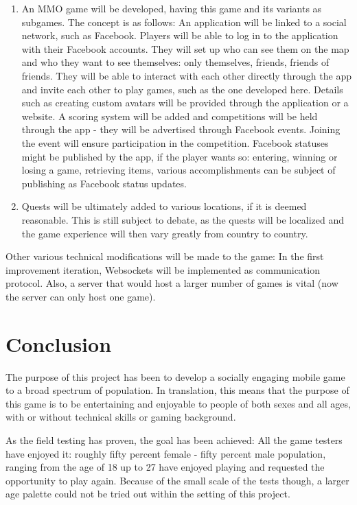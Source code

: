 \begin{enumerate}
  \item An MMO game will be developed, having this game and its variants as
  subgames. The concept is as follows: An application will be linked to a social
  network, such as Facebook. Players will be able to log in to the application
  with their Facebook accounts. They will set up who can see them on the map and
  who they want to see themselves: only themselves, friends, friends of friends.
  They will be able to interact with each other directly through the app and
  invite each other to play games, such as the one developed here. Details such
  as creating custom avatars will be provided through the application or a
  website. A scoring system will be added and competitions will be held through
  the app - they will be advertised through Facebook events. Joining the event
  will ensure participation in the competition. Facebook statuses might be
  published by the app, if the player wants so: entering, winning or losing a
  game, retrieving items, various accomplishments can be subject of publishing
  as Facebook status updates.
  
  \item Quests will be ultimately added to various locations, if it is deemed
  reasonable. This is still subject to debate, as the quests will be localized
  and the game experience will then vary greatly from country to country.  
  
\end{enumerate}

Other various technical modifications will be made to the game: In the first
improvement iteration, Websockets will be implemented as communication protocol.
Also, a server that would host a larger number of games is vital (now the
server can only host one game).


\section{Conclusion}

The purpose of this project has been to develop a socially engaging mobile game
to a broad spectrum of population. In translation, this means that the purpose
of this game is to be entertaining and enjoyable to people of both sexes and all
ages, with or without technical skills or gaming background. \newline

As the field testing has proven, the goal has been achieved: All the game
testers have enjoyed it: roughly fifty percent female - fifty percent male
population, ranging from the age of 18 up to 27 have enjoyed playing and
requested the opportunity to play again. Because of the small scale of the
tests though, a larger age palette could not be tried out within the setting of
this project.\newline

